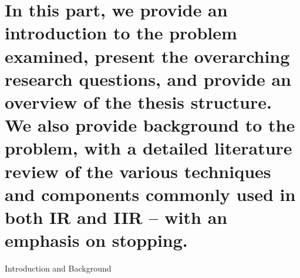 
\part[Introduction and Background]{In this part, we provide an introduction to the problem examined, present the overarching research questions, and provide an overview of the thesis structure. We also provide background to the problem, with a detailed literature review of the various techniques and components commonly used in both IR and IIR – with an emphasis on stopping.}{Introduction and Background}
\label{part:intro}